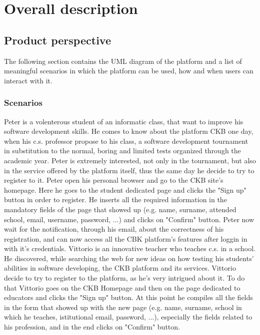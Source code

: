 \documentclass{article}
\newcounter{subsubsubsection}[subsubsection]
\begin{document}
{\newpage

\pagestyle{OverallDescriptionStyle}

\section{Overall description}
    \subsection{Product perspective}
        The following section contains the UML diagram of the platform and a list of meaningful scenarios in which the platform can be used, how and when users can interact with it.
        \subsubsection{Scenarios}
                Peter is a volenterous student of an informatic class, that want to improve his software development skills. He comes to know about the platform CKB one day, when his c.s. professor propose to his class, a software development tournament in substitution to the normal, boring and limited tests organized through the academic year.
                Peter is extremely interested, not only in the tournament, but also in the service offered by the platform itself, thus the same day he decide to try to register to it.
                Peter open his personal browser and go to the CKB site's homepage. Here he goes to the student dedicated page and clicks the "Sign up" button in order to register. He inserts all the required information in the mandatory fields of the page that showed up (e.g. name, surname, attended school, email, username, password, ...) and clicks on "Confirm" button.
                Peter now wait for the notification, through his email, about the correctness of his registration, and can now access all the CBK platform's features after loggin in with it's credentials.
                Vittorio is an innovative teacher who teaches c.s. in a school. He discovered, while searching the web for new ideas on how testing his students' abilities in software developing, the CKB platform and its services.
                Vittorio decide to try to register to the platform, as he's very intrigued about it. To do that Vittorio goes on the CKB Homepage and then on the page dedicated to educators and clicks the "Sign up" button. At this point he compiles all the fields in the form that showed up with the new page (e.g. name, surname, school in which he teaches, istitutional email, password, ...), especially the fields related to his profession, and in the end clicks on "Confirm" button.
}
\end{document}
